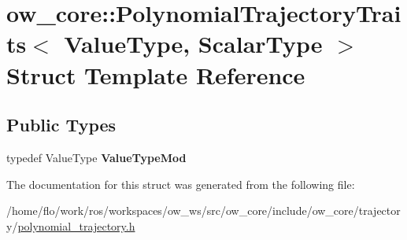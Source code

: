 \hypertarget{structow__core_1_1PolynomialTrajectoryTraits}{}\section{ow\+\_\+core\+:\+:Polynomial\+Trajectory\+Traits$<$ Value\+Type, Scalar\+Type $>$ Struct Template Reference}
\label{structow__core_1_1PolynomialTrajectoryTraits}
\subsection*{Public Types}
\begin{DoxyCompactItemize}
\item 
typedef Value\+Type {\bfseries Value\+Type\+Mod}\hypertarget{structow__core_1_1PolynomialTrajectoryTraits_a4157cb88f9537dc2a53eb6278ebe9503}{}\label{structow__core_1_1PolynomialTrajectoryTraits_a4157cb88f9537dc2a53eb6278ebe9503}

\end{DoxyCompactItemize}


The documentation for this struct was generated from the following file\+:\begin{DoxyCompactItemize}
\item 
/home/flo/work/ros/workspaces/ow\+\_\+ws/src/ow\+\_\+core/include/ow\+\_\+core/trajectory/\hyperlink{polynomial__trajectory_8h}{polynomial\+\_\+trajectory.\+h}\end{DoxyCompactItemize}
